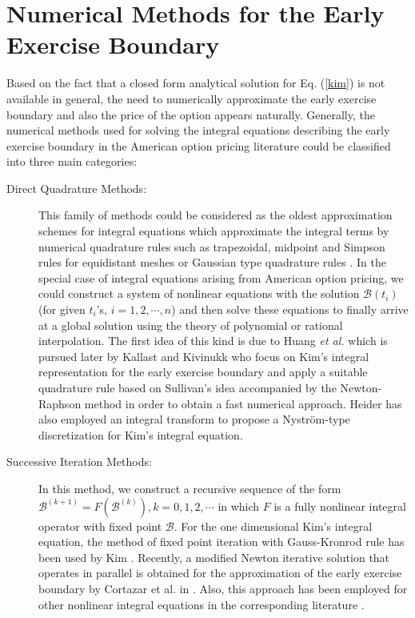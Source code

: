 \documentclass[fleqn,final,3p,11pt]{elsarticle}
\theoremstyle{definition}
\theoremstyle{remark}
\numberwithin{equation}{section}
\begin{document}
\section{Numerical Methods for the Early Exercise Boundary}\label{NMEEB}
Based on the fact that a closed form analytical solution for Eq. (\ref{kim}) is not available in general, the need to numerically approximate the early exercise boundary and also the price of the option appears naturally.
Generally, the numerical methods used for solving the integral equations describing the early exercise boundary in the American option pricing literature could be classified into three main categories:
\begin{description}
\item[Direct Quadrature Methods:]  This family of methods could be considered as the oldest approximation schemes for integral equations which approximate the integral terms by numerical quadrature rules such as trapezoidal, midpoint and Simpson rules for equidistant meshes or Gaussian type quadrature rules \cite{hack}. In the special case of integral equations arising from American option pricing, we could construct a system of nonlinear equations with the solution $\mathcal{B}(t_{i})$ (for given $t_{i}$'s, $i=1,2,\cdots,n$) and then solve these equations to finally arrive at  a global solution using the theory of polynomial or rational interpolation. The first idea of this kind is due to Huang \textit{et al.} \cite{huang1996pricing} which is pursued later by Kallast and Kivinukk \cite{kallast} who focus on Kim's integral representation for the early exercise boundary and apply a suitable quadrature rule based on Sullivan's idea \cite{sullivan} accompanied by the Newton-Raphson method in order to obtain a fast numerical approach. Heider \cite{heider} has also employed an integral transform to propose a Nystr\"{o}m-type discretization for Kim's integral equation.
\end{description}
\begin{description}
\item[Successive Iteration Methods:] In this method, we construct a recursive sequence of the form $\mathcal{B}^{(k+1)} = F (\mathcal{B}^{(k)}), k=0,1,2,\cdots$ in which $F$ is a fully nonlinear integral operator with fixed point $\mathcal{B}$. For the one dimensional Kim's integral equation, the method of fixed point iteration with Gauss-Kronrod rule has been used by Kim \cite{kim2}. Recently,  a modified Newton iterative solution that operates in parallel is obtained for the approximation of the early exercise boundary by Cortazar et al. in \cite{cortazar}. Also, this approach has been employed for other nonlinear integral equations in the corresponding literature \cite{lauko, shev2}.
\end{description}
\end{document}
